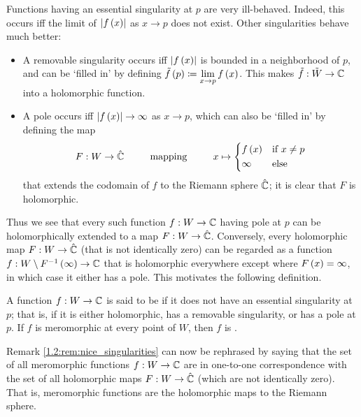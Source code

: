 \documentclass[../Moduli_Spaces_of_Riemann_Surfaces.tex]{subfiles}
\begin{document}
    \begin{remark}\label{1.2:rem:nice_singularities}
        Functions having an essential singularity at $p$ are very ill-behaved. Indeed, this occurs iff the limit of $\left|f\left(x\right)\right|$ as $x\to p$ does not exist. Other singularities behave much better:
        \begin{itemize}
            \item A removable singularity occurs iff $\left|f\left(x\right)\right|$ is bounded in a neighborhood of $p$, and can be $\textrm{`}$filled in$\textrm{'}$ by defining $\tilde{f}\left(p\right)\coloneqq\lim\limits_{x\to p}f\left(x\right)$. This makes $\tilde{f}:\tilde{W}\to\mathbb{C}$ into a holomorphic function.
            \vspace{-0.08in}
            \item A pole occurs iff $\left|f\left(x\right)\right|\to\infty$ as $x\to p$, which can also be $\textrm{`}$filled in$\textrm{'}$ by defining the map
                \begin{equation*}
                    F:W\to\RS\ \ \ \ \ \ \ \ \textrm{mapping}\ \ \ \ \ \ \ \ x\mapsto
                    \begin{dcases}
                        f\l(x\r) & \textrm{if }x\neq p \\
                        \infty & \textrm{else}
                    \end{dcases}
                \end{equation*}
                that extends the codomain of $f$ to the Riemann sphere $\hat{\mathbb{C}}$; it is clear that $F$ is holomorphic.
        \end{itemize}
        Thus we see that every such function $f:W\to\mathbb{C}$ having pole at $p$ can be holomorphically extended to a map $F:W\to\hat{\mathbb{C}}$. Conversely, every holomorphic map $F:W\to\hat{\mathbb{C}}$ (that is not identically zero) can be regarded as a function $f:W\setminus F^{-1}\left(\infty\right)\to\mathbb{C}$ that is holomorphic everywhere except where $F\left(x\right)=\infty$, in which case it either has a pole. This motivates the following definition.\exqed
    \end{remark}
    \begin{definition}
        A function $f:W\to\mathbb{C}$ is said to be  if it does not have an essential singularity at $p$; that is, if it is either holomorphic, has a removable singularity, or has a pole at $p$. If $f$ is meromorphic at every point of $W$, then $f$ is .
    \end{definition}
    \begin{remark}
        Remark \ref{1.2:rem:nice_singularities} can now be rephrased by saying that the set of all meromorphic functions $f:W\to\mathbb{C}$ are in one-to-one correspondence with the set of all holomorphic maps $F:W\to\hat{\mathbb{C}}$ (which are not identically zero). That is, meromorphic functions are the holomorphic maps to the Riemann sphere.\exqed
    \end{remark}
\end{document}
